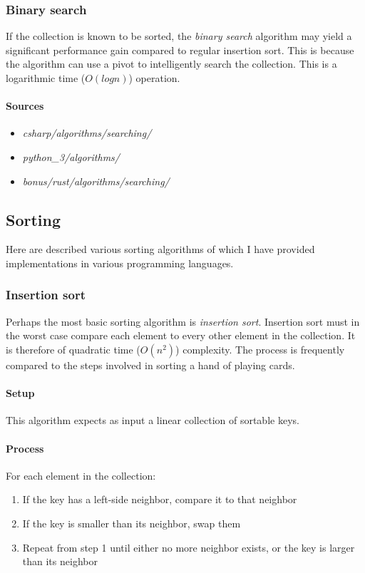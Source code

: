 \documentclass{article}
\begin{document}
\subsubsection{Binary search}
If the collection is known to be sorted, the {\em binary search} algorithm may yield a significant performance
gain compared to regular insertion sort. This is because the algorithm can use a pivot to intelligently search
the collection. This is a logarithmic time (\(O(log n)\)) operation.


\paragraph{Sources}
\begin{itemize}
\item{{\em csharp/algorithms/searching/}}
\item{{\em python\_3/algorithms/}}
\item{{\em bonus/rust/algorithms/searching/}}
\end{itemize}


\newpage


\subsection{Sorting}
Here are described various sorting algorithms of which I have provided implementations in various programming
languages.

\subsubsection{Insertion sort}
Perhaps the most basic sorting algorithm is {\em insertion sort}. Insertion sort must in the worst case compare
each element to every other element in the collection. It is therefore of quadratic time (\(O(n^2)\)) complexity.
The process is frequently compared to the steps involved in sorting a hand of playing cards.

\paragraph{Setup}
This algorithm expects as input a linear collection of sortable keys.

\paragraph{Process}
For each element in the collection:
\begin{enumerate}
\item{If the key has a left-side neighbor, compare it to that neighbor}
\item{If the key is smaller than its neighbor, swap them}
\item{Repeat from step 1 until either no more neighbor exists, or the key is larger than its neighbor}
\end{enumerate}
\end{document}
